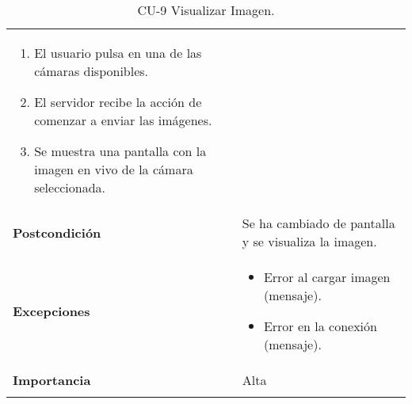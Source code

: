 \begin{longtable}[h!]{@{}ll@{}}
\begin{minipage}[t]{0.71\columnwidth}
\begin{enumerate}
\def\labelenumi{\arabic{enumi}.}
\tightlist
\item
  El usuario pulsa en una de las cámaras disponibles.
\item
  El servidor recibe la acción de comenzar a enviar las imágenes.
\item
  Se muestra una pantalla con la imagen en vivo de la cámara seleccionada.
\end{enumerate}\strut
\end{minipage}\tabularnewline
\begin{minipage}[t]{0.23\columnwidth}\raggedright\strut
\textbf{Postcondición}\strut
\end{minipage} & \begin{minipage}[t]{0.71\columnwidth}\raggedright\strut
Se ha cambiado de pantalla y se visualiza la imagen.\strut
\end{minipage}\tabularnewline
\begin{minipage}[t]{0.23\columnwidth}\raggedright\strut
\textbf{Excepciones}\strut
\end{minipage} & \begin{minipage}[t]{0.71\columnwidth}\raggedright\strut
\begin{itemize}
\tightlist
\item
  Error al cargar imagen (mensaje).
\item
  Error en la conexión (mensaje).
\end{itemize}\strut
\end{minipage}\tabularnewline
\begin{minipage}[t]{0.23\columnwidth}\raggedright\strut
\textbf{Importancia}\strut
\end{minipage} & \begin{minipage}[t]{0.71\columnwidth}\raggedright\strut
Alta\strut
\end{minipage}\tabularnewline
\bottomrule
\caption{CU-9 Visualizar Imagen.}
\end{longtable}


